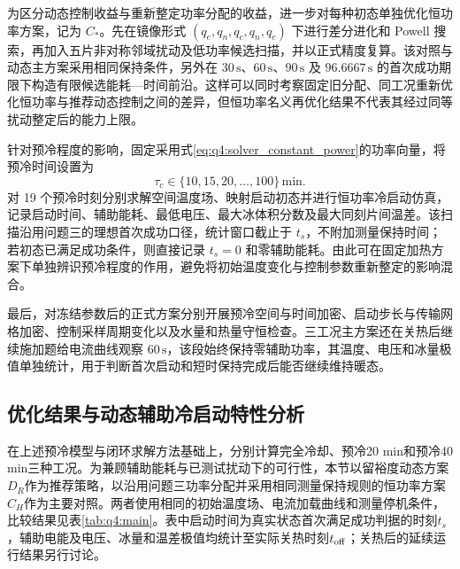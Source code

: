 \documentclass[bwprint]{gmcmthesis}
\numberwithin{figure}{section}
\begin{document}
为区分动态控制收益与重新整定功率分配的收益，进一步对每种初态单独优化恒功率方案，记为 \(C_*\)。先在镜像形式 \((q_e,q_n,q_c,q_n,q_e)\) 下进行差分进化和 Powell 搜索，再加入五片非对称邻域扰动及低功率候选扫描，并以正式精度复算。该对照与动态主方案采用相同保持条件，另外在 \(30\,\mathrm s\)、\(60\,\mathrm s\)、\(90\,\mathrm s\) 及 \(96.6667\,\mathrm s\) 的首次成功期限下构造有限候选能耗—时间前沿。这样可以同时考察固定旧分配、同工况重新优化恒功率与推荐动态控制之间的差异，但恒功率名义再优化结果不代表其经过同等扰动整定后的能力上限。

针对预冷程度的影响，固定采用式\eqref{eq:q4:solver_constant_power}的功率向量，将预冷时间设置为
\begin{equation}
\tau_c\in\{10,15,20,\ldots,100\}\,\mathrm{min}.
\tag{7-45}\label{eq:q4:solver_cooling_scan}
\end{equation}
对 19 个预冷时刻分别求解空间温度场、映射启动初态并进行恒功率冷启动仿真，记录启动时间、辅助能耗、最低电压、最大冰体积分数及最大同刻片间温差。该扫描沿用问题三的理想首次成功口径，统计窗口截止于 \(t_s\)，不附加测量保持时间；若初态已满足成功条件，则直接记录 \(t_s=0\) 和零辅助能耗。由此可在固定加热方案下单独辨识预冷程度的作用，避免将初始温度变化与控制参数重新整定的影响混合。

最后，对冻结参数后的正式方案分别开展预冷空间与时间加密、启动步长与传输网格加密、控制采样周期变化以及水量和热量守恒检查。三工况主方案还在关热后继续施加题给电流曲线观察 \(60\,\mathrm s\)，该段始终保持零辅助功率，其温度、电压和冰量极值单独统计，用于判断首次启动和短时保持完成后能否继续维持暖态。

\subsection{优化结果与动态辅助冷启动特性分析}
\label{sec:q4:results}

在上述预冷模型与闭环求解方法基础上，分别计算完全冷却、预冷20 min和预冷40 min三种工况。为兼顾辅助能耗与已测试扰动下的可行性，本节以留裕度动态方案\(D_R\)作为推荐策略，以沿用问题三功率分配并采用相同测量保持规则的恒功率方案\(C_H\)作为主要对照。两者使用相同的初始温度场、电流加载曲线和测量停机条件，比较结果见表\ref{tab:q4:main}。表中启动时间为真实状态首次满足成功判据的时刻\(t_s\)，辅助电能及电压、冰量和温差极值均统计至实际关热时刻\(t_{\rm off}\)；关热后的延续运行结果另行讨论。
\end{document}
